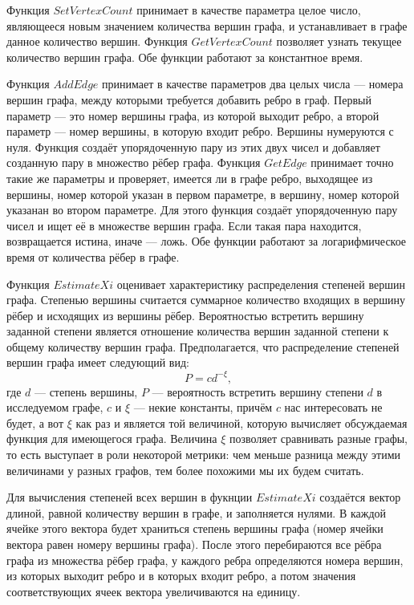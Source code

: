 \documentclass[14pt]{extreport}
\begin{document}
Функция $SetVertexCount$ принимает в качестве параметра целое число, являющееся новым значением количества вершин графа, и устанавливает в графе данное количество вершин. Функция $GetVertexCount$ позволяет узнать текущее количество вершин графа. Обе функции работают за константное время.

Функция $AddEdge$ принимает в качестве параметров два целых числа --- номера вершин графа, между которыми требуется добавить ребро в граф. Первый параметр --- это номер вершины графа, из которой выходит ребро, а второй параметр --- номер вершины, в которую входит ребро. Вершины нумеруются с нуля. Функция создаёт упорядоченную пару из этих двух чисел и добавляет созданную пару в множество рёбер графа. Функция $GetEdge$ принимает точно такие же параметры и проверяет, имеется ли в графе ребро, выходящее из вершины, номер которой указан в первом параметре, в вершину, номер которой указанан во втором параметре. Для этого функция создаёт упорядоченную пару чисел и ищет её в множестве вершин графа. Если такая пара находится, возвращается истина, иначе --- ложь. Обе функции работают за логарифмическое время от количества рёбер в графе.

Функция $EstimateXi$ оценивает характеристику распределения степеней вершин графа. Степенью вершины считается суммарное количество входящих в вершину рёбер и исходящих из вершины рёбер. Вероятностью встретить вершину заданной степени является отношение количества вершин заданной степени к общему количеству вершин графа. Предполагается, что распределение степеней вершин графа имеет следующий вид:
$$
P = c d^{-\xi},
$$
где $d$ --- степень вершины, $P$ --- вероятность встретить вершину степени $d$ в исследуемом графе, $c$ и $\xi$ --- некие константы, причём $c$ нас интересовать не будет, а вот $\xi$ как раз и является той величиной, которую вычисляет обсуждаемая функция для имеющегося графа. Величина $\xi$ позволяет сравнивать разные графы, то есть выступает в роли некоторой метрики: чем меньше разница между этими величинами у разных графов, тем более похожими мы их будем считать.

Для вычисления степеней всех вершин в фукнции $EstimateXi$ создаётся вектор длиной, равной количеству вершин в графе, и заполняется нулями. В каждой ячейке этого вектора будет храниться степень вершины графа (номер ячейки вектора равен номеру вершины графа). После этого перебираются все рёбра графа из множества рёбер графа, у каждого ребра определяются номера вершин, из которых выходит ребро и в которых входит ребро, а потом значения соответствующих ячеек вектора увеличиваются на единицу.
\end{document}
